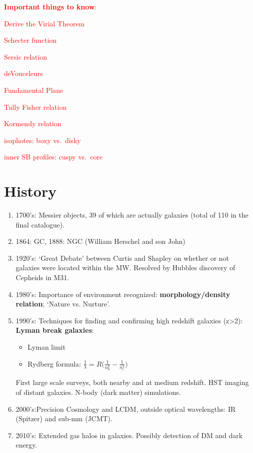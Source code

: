\documentclass[12pt]{article}
\begin{document}
\textcolor{red}{\textbf{Important things to know}:
\begin{itemize*}
    \item Derive the Virial Theorem
    \item Schecter function
    \item Sersic relation
    \item deVouceleurs
    \item Fundamental Plane
    \item Tully Fisher relation
    \item Kormendy relation
    \item isophotes: boxy vs.\ disky
    \item inner SB profiles: cuspy vs.\ core
\end{itemize*}
}

\section{History}
\begin{enumerate}
  \item 1700's: Messier objects, 39 of
  which are actually galaxies (total of 110 in the final catalogue).
  \item 1864: GC, 1888: NGC (William Herschel and son John)
  \item 1920's: `Great Debate' between Curtis and Shapley on whether
  or not galaxies were located within the MW\@. Resolved by Hubbles
  discovery of Cepheids in M31.
  \item 1980's: Importance of environment recognized:
  \textbf{morphology/density relation}; `Nature vs. Nurture'.
  \item 1990's: Techniques for finding and confirming high redshift
  galaxies (z>2): \textbf{Lyman break galaxies}:
  \begin{itemize}
    \item Lyman limit
    \item Rydberg formula: $\frac{1}{\lambda}=
    R\Big(\frac{1}{n_u^2}-\frac{1}{n_l^2}\Big) $
  \end{itemize}
  First large scale surveys, both nearby and at medium redshift. HST
  imaging of distant galaxies. N-body (dark matter) simulations.
  \item 2000's:Precision Cosmology and LCDM, outside optical
  wavelengths: IR (Spitzer) and sub-mm (JCMT).
  \item 2010's: Extended gas halos in galaxies. Possibly detection of
  DM and dark energy.
\end{enumerate}
\end{document}
